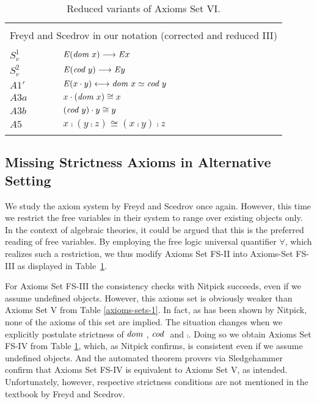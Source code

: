 \begin{table}
\begin{tabular}{ll}
\hline
\\
\multicolumn{2}{c}{Freyd and Scedrov in our notation (corrected and
  reduced III)} \\
\\
 $S^1_{v}$ & $\mathit{E} (\textit{dom \/} x) \longrightarrow \mathit{E} x$ \\
  $S^2_{v}$ & $\mathit{E} (\textit{cod \/} y) \longrightarrow \mathit{E} y$ \\
  $A1'$  & $\mathit{E} (x \cdot y) \longleftrightarrow \textit{dom \/} x \simeq\textit{cod \/} y$ \\
  $A3a$  & $x \cdot (\textit{dom \/} x) \cong x$ \\ 
  $A3b$ & $(\textit{cod \/} y) \cdot y \cong y$ \\
  $A5$   & $x \comp (y \comp z) \cong  (x \comp y) \comp z$   \\
\\
\hline
\end{tabular}
\caption{Reduced variants of Axioms Set VI.\label{axioms-sets-3}}
\end{table}


\subsection{Missing Strictness Axioms in Alternative
  Setting} \label{subsec-freyd-scedrov-2} We study the axiom system by
Freyd and Scedrov once again. However, this time we restrict the free
variables in their system to range over existing objects only. In the
context of algebraic theories, it could be argued that this is the
preferred reading of free variables.  By employing the free logic
universal quantifier $\forall$, which realizes such a restriction, 
we thus modify Axioms Set FS-II into
Axioms-Set FS-III as displayed in Table~\ref{axioms-sets-3}.  

For Axioms Set FS-III the consistency checks with Nitpick succeeds,
even if we assume undefined objects. However, this axioms set is
obviously weaker than Axioms Set V from Table
\ref{axioms-sets-1}. In fact, as has been shown by Nitpick, none of
the axioms of this set are implied.  The situation changes when we
explicitly postulate strictness of $\textit{dom \/}$, $\textit{cod \/}$ and $\comp$. Doing
so we obtain Axioms Set FS-IV from Table \ref{axioms-sets-3}, which,
as Nitpick confirms, is consistent even if we assume undefined
objects. And the automated theorem provers via Sledgehammer confirm
that Axioms Set FS-IV is equivalent to Axioms Set V, as
intended. Unfortunately, however, respective strictness conditions are
not mentioned in the textbook by Freyd and Scedrov.



